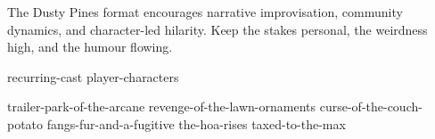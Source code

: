 The Dusty Pines format encourages narrative improvisation, community dynamics, and character-led hilarity. Keep the stakes personal, the weirdness high, and the humour flowing.

{recurring-cast}
{player-characters}

{trailer-park-of-the-arcane}
{revenge-of-the-lawn-ornaments}
{curse-of-the-couch-potato}
{fangs-fur-and-a-fugitive}
{the-hoa-rises}
{taxed-to-the-max}




